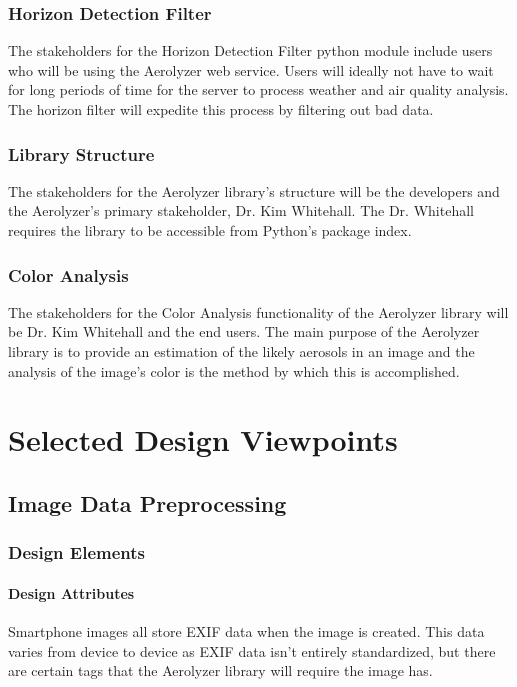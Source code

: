 \documentclass[onecolumn, draftclsnofoot,10pt, compsoc]{IEEEtran}
\begin{document}
\begin{singlespace}
        \subsubsection{Horizon Detection Filter}
        The stakeholders for the Horizon Detection Filter python module include users who will be using the Aerolyzer web service. Users will ideally not have to wait for long periods of time for the server to process weather and air quality analysis. The horizon filter will expedite this process by filtering out bad data.
        \subsubsection{Library Structure}
        The stakeholders for the Aerolyzer library’s structure will be the developers and the Aerolyzer’s primary stakeholder, Dr. Kim Whitehall. The Dr. Whitehall requires the library to be accessible from Python’s package index.
		\subsubsection{Color Analysis}
        The stakeholders for the Color Analysis functionality of the Aerolyzer library will be Dr. Kim Whitehall and the end users. The main purpose of the Aerolyzer library is to provide an estimation of the likely aerosols in an image and the analysis of the image's color is the method by which this is accomplished.
\section{Selected Design Viewpoints}
	\subsection{Image Data Preprocessing}
      \subsubsection{Design Elements}
          \paragraph{Design Attributes}
          Smartphone images all store EXIF data when the image is created. This data varies from device to device as EXIF data isn't entirely standardized, but there are certain tags that the Aerolyzer library will require the image has.

\end{singlespace}
\end{document}
